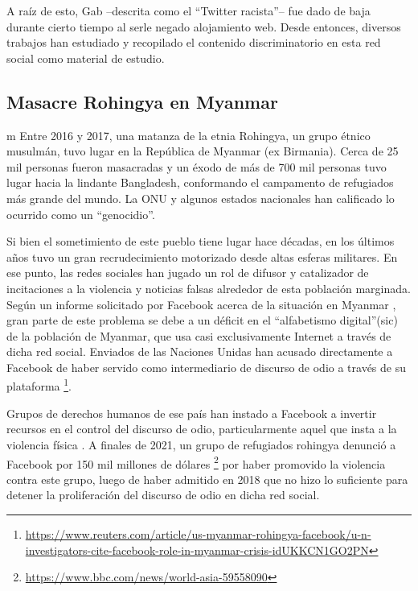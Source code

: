 A raíz de esto, Gab --descrita como el ``Twitter racista''-- fue dado de baja durante cierto tiempo al serle negado alojamiento web. Desde entonces, diversos trabajos han estudiado y recopilado el contenido discriminatorio en esta red social \cite{mcilroy2019welcome,kennedy2018gab} como material de estudio.



\subsection{Masacre Rohingya en Myanmar}m
%
Entre 2016 y 2017, una matanza de la etnia Rohingya, un grupo étnico musulmán, tuvo lugar en la República de Myanmar (ex Birmania). Cerca de 25 mil personas fueron masacradas y un éxodo de más de 700 mil personas tuvo lugar hacia la lindante Bangladesh, conformando el campamento de refugiados más grande del mundo. La ONU y algunos estados nacionales han calificado lo ocurrido como un ``genocidio''.


Si bien el sometimiento de este pueblo tiene lugar hace décadas, en los últimos años tuvo un gran recrudecimiento motorizado desde altas esferas militares. En ese punto, las redes sociales han jugado un rol de difusor y catalizador de incitaciones a la violencia y noticias falsas alrededor de esta población marginada. Según un informe solicitado por Facebook acerca de la situación en Myanmar \cite{warofka2018independent}, gran parte de este problema se debe a un déficit en el ``alfabetismo digital''(sic) de la población de Myanmar, que usa casi exclusivamente Internet a través de dicha red social. Enviados de las Naciones Unidas han acusado directamente a Facebook de haber servido como intermediario de discurso de odio a través de su plataforma \footnote{\url{https://www.reuters.com/article/us-myanmar-rohingya-facebook/u-n-investigators-cite-facebook-role-in-myanmar-crisis-idUKKCN1GO2PN}}.

Grupos de derechos humanos de ese país han instado a Facebook a invertir recursos en el control del discurso de odio, particularmente aquel que insta a la violencia física \cite{irrawaddy2018zuckerberg}. A finales de 2021, un grupo de refugiados rohingya denunció a Facebook por 150 mil millones de dólares \footnote{\url{https://www.bbc.com/news/world-asia-59558090}} por haber promovido la violencia contra este grupo, luego de haber admitido en 2018 que no hizo lo suficiente para detener la proliferación del discurso de odio en dicha red social.

